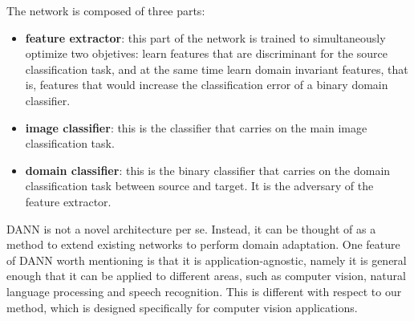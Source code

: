 \documentclass[../main.tex]{subfiles}
\begin{document}
    The network is composed of three parts:
    \begin{itemize}
        \item \textbf{feature extractor}: this part of the network is trained to simultaneously optimize two objetives: learn features
            that are discriminant for the source classification task, and at the same time learn domain invariant features, that is,
            features that would increase the classification error of a binary domain classifier.
        \item \textbf{image classifier}: this is the classifier that carries on the main image classification task.
        \item \textbf{domain classifier}: this is the binary classifier that carries on the domain classification task between source and
            target. It is the adversary of the feature extractor.
    \end{itemize}
    
    DANN is not a novel architecture per se. Instead, it can be thought of as a
    method to extend existing networks to perform domain adaptation. One feature
    of DANN worth mentioning is that it is application-agnostic, namely
    it is general enough that it can be applied to different areas, such as
    computer vision, natural language processing and speech recognition.
    This is different with respect to our method, which is designed specifically
    for computer vision applications.
\end{document}
